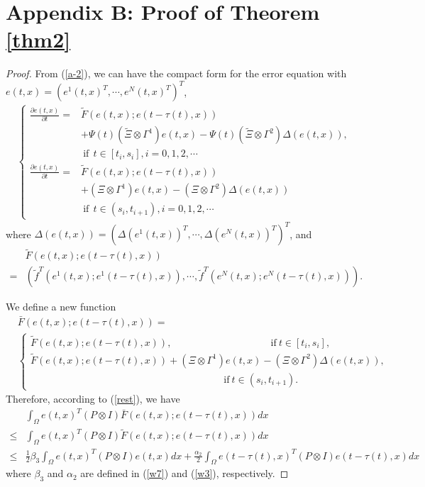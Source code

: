 \documentclass[review]{elsarticle}
\begin{document}
\section*{Appendix B: Proof of Theorem \ref{thm2}}\label{appB}
\begin{proof}
From (\ref{a-2}), we can have the compact form for the error equation with $e(t,x)=(e^1(t,x)^T,\cdots,e^N(t,x)^T)^T$,
\begin{align}\label{b-1}
\left\{
\begin{array}{cl}
\frac{\partial{e(t,x)}}{\partial{t}}=&\tilde{F}(e(t,x);e(t-\tau(t),x))\\
&+\Psi(t)(\tilde{\Xi}\otimes\Gamma^1)
e(t,x)-\Psi(t)(\tilde{\Xi}\otimes\Gamma^2)
\Delta(e(t,x)),\\
&~\mathrm{if}~~t\in [t_i,s_i], i=0,1,2,\cdots\\
\frac{\partial{e(t,x)}}{\partial{t}}=&\tilde{F}(e(t,x);e(t-\tau(t),x))\\
&+({\Xi}\otimes\Gamma^1)
e(t,x)-({\Xi}\otimes\Gamma^2)
\Delta(e(t,x))\\
&~\mathrm{if}~~t\in (s_i,t_{i+1}), i=0,1,2,\cdots
\end{array}
\right.
\end{align}
where $\Delta(e(t,x))=(\Delta(e^1(t,x))^T,\cdots,\Delta(e^N(t,x))^T)^T$, and
\begin{align*}
&\tilde{F}(e(t,x);e(t-\tau(t),x))\\
=&(\tilde{f}^T(e^1(t,x);e^1(t-\tau(t),x)),\cdots,\tilde{f}^T(e^N(t,x);e^N(t-\tau(t),x))).
\end{align*}

We define a new function
\begin{align*}
&\bar{F}(e(t,x);e(t-\tau(t),x))=\\
&\left\{
\begin{array}{ll}
\tilde{F}(e(t,x);e(t-\tau(t),x)), ~~~~~~~~~~~~~~~~~~~~~~~~~~~~~~~~~~~~~~~~~~~~~\mathrm{if}~t\in[t_i,s_i],\\
\tilde{F}(e(t,x);e(t-\tau(t),x))+({\Xi}\otimes\Gamma^1)
e(t,x)-({\Xi}\otimes\Gamma^2)
\Delta(e(t,x)),\\
~~~~~~~~~~~~~~~~~~~~~~~~~~~~~~~~~~~~~~~~~~~~~~~~~~~~~~~~~~~~~~~~~~~~~~~~~~~~~~~~~~~~~~~~\mathrm{if}~t\in(s_i,t_{i+1}).
\end{array}
\right.
\end{align*}
Therefore, according to (\ref{rest}), we have
\begin{align*}
&\int_{\Omega}e(t,x)^T(P\otimes I)\bar{F}(e(t,x);e(t-\tau(t),x))dx\\
\leq&\int_{\Omega}e(t,x)^T(P\otimes I)\tilde{F}(e(t,x);e(t-\tau(t),x))dx\\
\leq&\frac{1}{2}\beta_3\int_{\Omega}e(t,x)^T(P\otimes I)e(t,x)dx+\frac{\alpha_2}{2}\int_{\Omega}e(t-\tau(t),x)^T(P\otimes I)e(t-\tau(t),x)dx
\end{align*}
where $\beta_3$ and $\alpha_2$ are defined in (\ref{w7}) and (\ref{w3}), respectively.


\end{proof}
\end{document}
